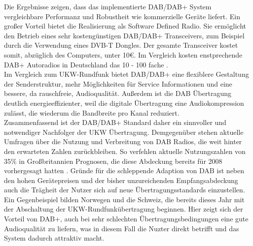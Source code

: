 Die Ergebnisse zeigen, dass das implementierte DAB/DAB+ System vergleichbare Performanz und Robustheit wie kommerzielle Geräte liefert. Ein großer Vorteil bietet die Realisierung als Software Defined Radio. Sie ermöglicht den Betrieb eines sehr kostengünstigen DAB/DAB+ Transceivers, zum Beispiel durch die Verwendung eines DVB-T Dongles. Der gesamte Transceiver kostet somit, abzüglich des Computers, unter 10\euro. Im Vergleich kosten enstprechende DAB+ Autoradios in Deutschland das 10 - 100 fache \cite{web:dab_im_auto}.\\

Im Vergleich zum UKW-Rundfunk bietet DAB/DAB+ eine flexiblere Gestaltung der Senderstruktur, mehr Möglichkeiten für Service Informationen und eine bessere, da rauschfreie, Audioqualität. Außerdem ist die DAB Übertragung deutlich energieeffizienter, weil die digitale Übertragung eine Audiokompression zulässt, die wiederum die Bandbreite pro Kanal reduziert.\\
Zusammenfassend ist der DAB/DAB+ Standard daher ein sinnvoller und notwendiger Nachfolger der UKW Übertragung. Demgegenüber stehen aktuelle Umfragen über die Nutzung und Verbreitung von DAB Radios, die weit hinter den erwarteten Zahlen zurückbleiben. So verfehlen aktuelle Nutzungszahlen von 35\% \cite{web:dab_in_uk} in Großbritannien Prognosen, die diese Abdeckung bereits für 2008 vorhergesagt hatten \cite{dab:ausblick}. Gründe für die schleppende Adaption von DAB ist neben den hohen Gerätepreisen und der bisher unzureichenden Empfangsabdeckung auch die Trägheit der Nutzer sich auf neue Übertragungsstandards einzustellen. Ein Gegenbeispiel bilden Norwegen und die Schweiz, die bereits dieses Jahr mit der Abschaltung der UKW-Rundfunkübertragung beginnen. Hier zeigt sich der Vorteil von DAB+, auch bei sehr schlechten Übertragungsbedingungen eine gute Audioqualität zu liefern, was in diesem Fall die Nuzter direkt betrifft und das System dadurch attraktiv macht.